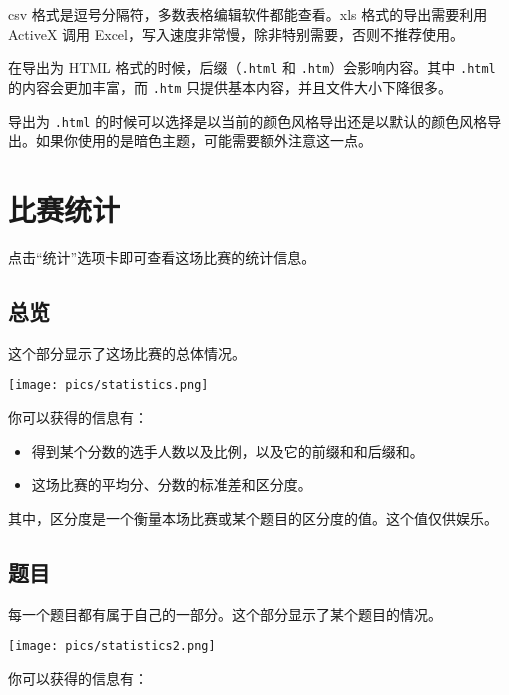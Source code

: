 \documentclass[UTF-8]{ctexart}
\begin{document}
    csv 格式是逗号分隔符，多数表格编辑软件都能查看。xls 格式的导出需要利用 ActiveX 调用 Excel，写入速度非常慢，除非特别需要，否则不推荐使用。

    在导出为 HTML 格式的时候，后缀（\texttt{.html} 和 \texttt{.htm}）会影响内容。其中 \texttt{.html} 的内容会更加丰富，而 \texttt{.htm} 只提供基本内容，并且文件大小下降很多。

    导出为 \texttt{.html} 的时候可以选择是以当前的颜色风格导出还是以默认的颜色风格导出。如果你使用的是暗色主题，可能需要额外注意这一点。

    \newpage

    \section{比赛统计}

    点击“统计”选项卡即可查看这场比赛的统计信息。

    \subsection{总览}

    这个部分显示了这场比赛的总体情况。

    \begin{center}
        \texttt{[image: pics/statistics.png]}
    \end{center}

    你可以获得的信息有：

    \begin{itemize}
        \item 得到某个分数的选手人数以及比例，以及它的前缀和和后缀和。
        \item 这场比赛的平均分、分数的标准差和区分度。
    \end{itemize}

    其中，区分度是一个衡量本场比赛或某个题目的区分度的值。这个值仅供娱乐。


    \subsection{题目}

    每一个题目都有属于自己的一部分。这个部分显示了某个题目的情况。

    \begin{center}
        \texttt{[image: pics/statistics2.png]}
    \end{center}

    你可以获得的信息有：
\end{document}
